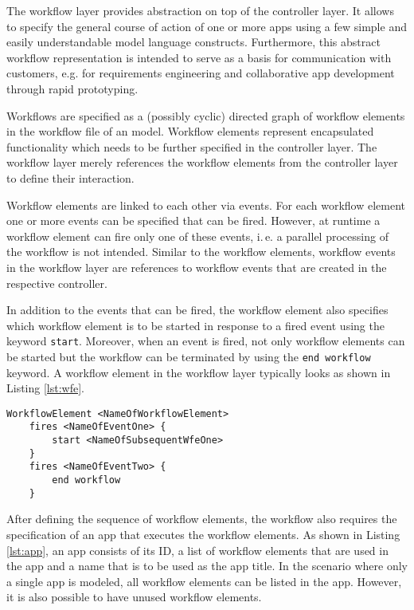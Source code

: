 
The workflow layer provides abstraction on top of the controller layer. It allows to specify the general course of action of one or more apps using a few simple and easily understandable model language constructs. Furthermore, this abstract workflow representation is intended to serve as a basis for communication with customers, e.g. for requirements engineering and collaborative app development through rapid prototyping.

Workflows are specified as a (possibly cyclic) directed graph of workflow elements in the workflow file of an \MD model. Workflow elements represent encapsulated functionality which needs to be further specified in the controller layer. The workflow layer merely references the workflow elements from the controller layer to define their interaction.

Workflow elements are linked to each other via events. For each workflow element one or more events can be specified that can be fired. However, at runtime a workflow element can fire only one of these events, i.\,e. a parallel processing of the workflow is not intended. Similar to the workflow elements, workflow events in the workflow layer are references to workflow events that are created in the respective controller.

In addition to the events that can be fired, the workflow element also specifies which workflow element is to be started in response to a fired event using the keyword {\lstinline!start!}. Moreover, when an event is fired, not only workflow elements can be started but the workflow can be terminated by using the \lstinline!end workflow! keyword.
A workflow element in the workflow layer typically looks as shown in Listing \ref{lst:wfe}.

\begin{lstlisting}[language=MD2, label=lst:wfe, caption=Workflow elements in the workflow layer]
 WorkflowElement <NameOfWorkflowElement>
 	fires <NameOfEventOne> {
		start <NameOfSubsequentWfeOne>
	}
	fires <NameOfEventTwo> {
		end workflow
	}
\end{lstlisting}

After defining the sequence of workflow elements, the workflow also requires the specification of an app that executes the workflow elements. As shown in Listing \ref{lst:app}, an app consists of its ID, a list of workflow elements that are used in the app and a name that is to be used as the app title. In the scenario where only a single app is modeled, all workflow elements can be listed in the app. However, it is also possible to have unused workflow elements.

